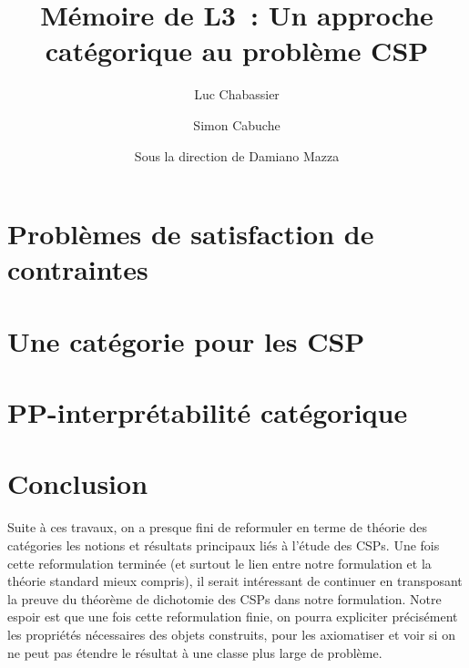 \documentclass[12pt]{article}
\title{Mémoire de L3~: Un approche catégorique au problème CSP}
\author{Luc Chabassier\and Simon Cabuche}
\date{\small Sous la direction de Damiano Mazza}
\begin{document}
\maketitle

\tableofcontents
\newpage


\section{Problèmes de satisfaction de contraintes}\label{secCSP}


\section{Une catégorie pour les CSP}\label{secCat}


\section{PP-interprétabilité catégorique}\label{secPP}


\section{Conclusion}

Suite à ces travaux, on a presque fini de reformuler en terme de théorie des
catégories les notions et résultats principaux liés à l'étude des CSPs. Une
fois cette reformulation terminée (et surtout le lien entre notre formulation
et la théorie standard mieux compris), il serait intéressant de continuer en
transposant la preuve du théorème de dichotomie des CSPs dans notre
formulation. Notre espoir est que une fois cette reformulation finie, on pourra
expliciter précisément les propriétés nécessaires des objets construits, pour
les axiomatiser et voir si on ne peut pas étendre le résultat à une classe plus
large de problème.
\end{document}
